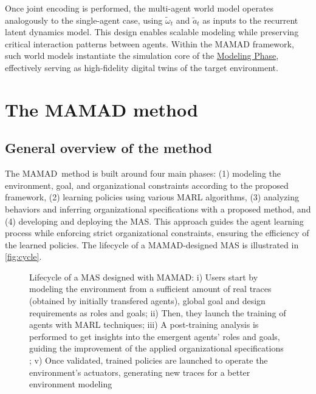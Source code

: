 \documentclass[pdflatex,sn-mathphys-num]{sn-jnl}%
\theoremstyle{thmstyleone}%
\theoremstyle{thmstyletwo}%
\theoremstyle{thmstylethree}%
\begin{document}
Once joint encoding is performed, the multi-agent world model operates analogously to the single-agent case, using $\tilde{\omega}_t$ and $\tilde{a}_t$ as inputs to the recurrent latent dynamics model. This design enables scalable modeling while preserving critical interaction patterns between agents. Within the MAMAD framework, such world models instantiate the simulation core of the \hyperref[sec:modelling]{Modeling Phase}, effectively serving as high-fidelity digital twins of the target environment.


\section{The MAMAD method}\label{sec:mamad}

\subsection{General overview of the method}

The MAMAD~\footnotemark[1] method is built around four main phases: (1) modeling the environment, goal, and organizational constraints according to the proposed framework, (2) learning policies using various MARL algorithms, (3) analyzing behaviors and inferring organizational specifications with a proposed method, and (4) developing and deploying the MAS. This approach guides the agent learning process while enforcing strict organizational constraints, ensuring the efficiency of the learned policies. The lifecycle of a MAMAD-designed MAS is illustrated in \autoref{fig:cycle}.

\begin{figure}[h!]
    \centering
    
    \caption{Lifecycle of a MAS designed with MAMAD: i) Users start by modeling the environment from a sufficient amount of real traces (obtained by initially transfered agents), global goal and design requirements as roles and goals; \quad ii) Then, they launch the training of agents with MARL techniques; \quad iii) A post-training analysis is performed to get insights into the emergent agents' roles and goals, guiding the improvement of the applied organizational specifications ; \quad v) Once validated, trained policies are launched to operate the environment's actuators, generating new traces for a better environment modeling}
    \label{fig:cycle}
\end{figure}
\end{document}
